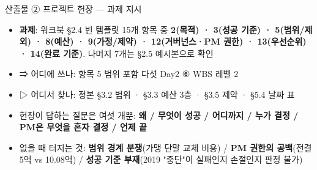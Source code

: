 \begin{frame}{산출물 ② 프로젝트 헌장 — 과제 지시}
\begin{itemize}
\item \textbf{과제}: 워크북 §2.4 빈 템플릿 15개 항목 중 \textbf{2(목적) · 3(성공 기준) · 5(범위/제외) · 8(예산) · 9(가정/제약) · 12(거버넌스·PM 권한) · 13(우선순위) · 14(완료 기준)}. 나머지 7개는 §2.5 예시본으로 확인
\item {\footnotesize ⇒ 어디에 쓰나: 항목 5 범위 포함 다섯 \ra{} Day2 ⑥ WBS 레벨 2}
\item {\footnotesize ▷ 어디서 찾나: 정본 §3.2 범위 · §3.3 예산 3층 · §3.5 제약 · §5.4 날짜 표}
\item 헌장이 답하는 질문은 여섯 개뿐: \textbf{왜 / 무엇이 성공 / 어디까지 / 누가 결정 / PM은 무엇을 혼자 결정 / 언제 끝}
\item 없을 때 터지는 것: \textbf{범위 경계 분쟁}(가맹 단말 교체 비용) / \textbf{PM 권한의 공백}(전결 5억 vs 10.08억) / \textbf{성공 기준 부재}(2019 "중단"이 실패인지 손절인지 판정 불가)
\end{itemize}
\end{frame}

